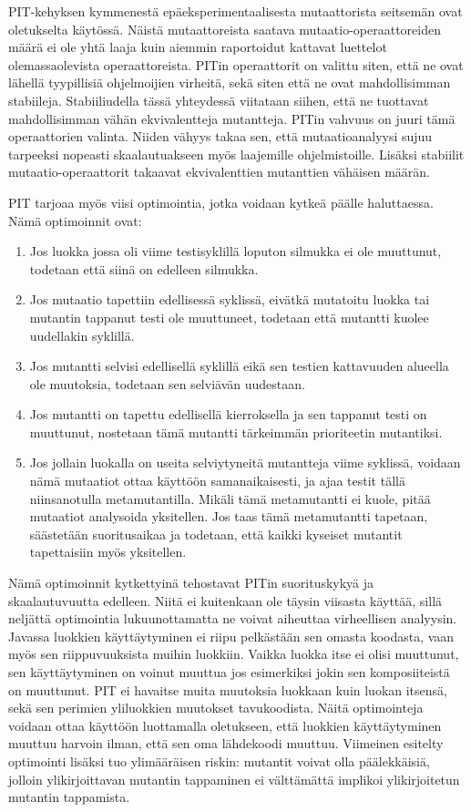 \documentclass{tktltiki}
\begin{document}
PIT-kehyksen kymmenestä epäeksperimentaalisesta mutaattorista seitsemän ovat oletukselta käytössä. Näistä mutaattoreista saatava mutaatio-operaattoreiden määrä ei ole yhtä laaja kuin aiemmin raportoidut kattavat luettelot olemassaolevista operaattoreista. PITin operaattorit on valittu siten, että ne ovat lähellä tyypillisiä ohjelmoijien virheitä, sekä siten että ne ovat mahdollisimman stabiileja. Stabiiliudella tässä yhteydessä viitataan siihen, että ne tuottavat mahdollisimman vähän ekvivalentteja mutantteja. PITin vahvuus on juuri tämä operaattorien valinta. Niiden vähyys takaa sen, että mutaatioanalyysi sujuu tarpeeksi nopeasti skaalautuakseen myös laajemille ohjelmistoille. Lisäksi stabiilit mutaatio-operaattorit takaavat ekvivalenttien mutanttien vähäisen määrän.

PIT tarjoaa myös viisi optimointia, jotka voidaan kytkeä päälle haluttaessa. Nämä optimoinnit ovat:
\begin{enumerate}
	\item Jos luokka jossa oli viime testisyklillä loputon silmukka ei ole muuttunut, todetaan että siinä on edelleen silmukka.
	\item Jos mutaatio tapettiin edellisessä syklissä, eivätkä mutatoitu luokka tai mutantin tappanut testi ole muuttuneet, todetaan että mutantti kuolee uudellakin syklillä.
	\item Jos mutantti selvisi edellisellä syklillä eikä sen testien kattavuuden alueella ole muutoksia, todetaan sen selviävän uudestaan. 
	\item Jos mutantti on tapettu edellisellä kierroksella ja sen tappanut testi on muuttunut, nostetaan tämä mutantti tärkeimmän prioriteetin mutantiksi.
	\item Jos jollain luokalla on useita selviytyneitä mutantteja viime syklissä, voidaan nämä mutaatiot ottaa käyttöön samanaikaisesti, ja ajaa testit tällä niinsanotulla metamutantilla. Mikäli tämä metamutantti ei kuole, pitää mutaatiot analysoida yksitellen. Jos taas tämä metamutantti tapetaan, säästetään suoritusaikaa ja todetaan, että kaikki kyseiset mutantit tapettaisiin myös yksitellen.
\end{enumerate}
Nämä optimoinnit kytkettyinä tehostavat PITin suorituskykyä ja skaalautuvuutta edelleen. Niitä ei kuitenkaan ole täysin viisasta käyttää, sillä neljättä optimointia lukuunottamatta ne voivat aiheuttaa virheellisen analyysin. Javassa luokkien käyttäytyminen ei riipu pelkästään sen omasta koodasta, vaan myös sen riippuvuuksista muihin luokkiin. Vaikka luokka itse ei olisi muuttunut, sen käyttäytyminen on voinut muuttua jos esimerkiksi jokin sen komposiiteistä on muuttunut. PIT ei havaitse muita muutoksia luokkaan kuin luokan itsensä, sekä sen perimien yliluokkien muutokset tavukoodista. Näitä optimointeja voidaan ottaa käyttöön luottamalla oletukseen, että luokkien käyttäytyminen muuttuu harvoin ilman, että sen oma lähdekoodi muuttuu. Viimeinen esitelty optimointi lisäksi tuo ylimääräisen riskin: mutantit voivat olla päälekkäisiä, jolloin ylikirjoittavan mutantin tappaminen ei välttämättä implikoi ylikirjoitetun mutantin tappamista.
\end{document}
